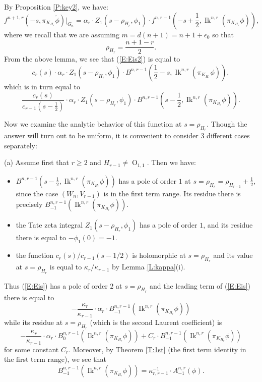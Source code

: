 \documentclass[10pt]{amsart}
\theoremstyle{plain}
\numberwithin{equation}{section}
\begin{document}
\vskip 10pt
  
  By Proposition \ref{P:key2}, we have:
  \[ f^{n+1,r}(-s, \pi_{K_{H_r}} \tilde{\phi})|_{G_{n}}
 = \alpha_r \cdot  Z_1(s - \rho_{H_r}, \phi_1) \cdot  f^{n,r-1}(  -s +
 \frac{1}{2},  {\operatorname{Ik}}^{n,r}(\pi_{K_{H_r}}\phi)), \] 
  where  we recall that  we are assuming $ m = d(n+1) = n+1
  +\epsilon_0$ so that
  \[  \rho_{H_r} = \frac{n+1-r}{2}. \]
  From the above lemma, we see that (\ref{E:Eis2})  is equal to
  \[    c_r(s) \cdot  \alpha_r \cdot Z_1(s - \rho_{H_r}, \phi_1)  \cdot
  B^{n,r-1}(\frac{1}{2}-s, {\operatorname{Ik}}^{n,r}(\pi_{K_{H_r}}\phi)),
   \]
  which is in turn equal to
  \[  \frac{c_r(s)}{c_{r-1}(s -\frac{1}{2})} \cdot  \alpha_r \cdot
  Z_1(s- \rho_{H_r}, \phi_1) \cdot B^{n, r-1}(s - \frac{1}{2},
  {\operatorname{Ik}}^{n,r}(\pi_{K_{H_r}}\phi)). \]
  \vskip 5pt
  
  Now we examine the analytic behavior of this function at 
  $s =\rho_{H_r}$. Though the answer will turn out to be uniform, it is convenient  to consider 3 different cases
  separately:
  \vskip 5pt
  
  \noindent (a)  Assume first that $r \geq 2$ and $H_{r-1} \ne {\operatorname{O}}_{1,1}$. Then we have:
  \begin{itemize}
  \item $B^{n,r-1}(s - \frac{1}{2} , {\operatorname{Ik}}^{n,r}(\pi_{K_{H_r}}\phi))$
    has a pole of order $1$ at $s = \rho_{H_r} = \rho_{H_{r-1}} +
    \frac{1}{2}$, since the case $(W_n, V_{r-1})$ is in the first term
    range. Its residue there is precisely
    $B_{-1}^{n,r-1}({\operatorname{Ik}}^{n,r}(\pi_{K_{H_r}}\phi))$. 
    \item   the Tate zeta integral $ Z_1(s -\rho_{H_r}, \phi_1)$ has a
      pole of order $1$, and its residue there is equal to $-
      \phi_1(0) =-1$. 
   \item the function $c_r(s)/c_{r-1}(s - 1/2)$ is holomorphic at $s =
     \rho_{H_r}$ and its value at $s = \rho_{H_r}$ is equal to
     $\kappa_r/ \kappa_{r-1}$ by Lemma \ref{L:kappa}(i).
  \end{itemize}
  \vskip 5pt
  
  Thus (\ref{E:Eis}) has a pole of order $2$ at $s = \rho_{H_r}$ and the leading term of (\ref{E:Eis}) there is equal to
 \[   - \frac{\kappa_r}{\kappa_{r-1}} \cdot \alpha_r \cdot
 B_{-1}^{n,r-1}({\operatorname{Ik}}^{n,r}(\pi_{K_{H_r}}\phi))   \]
 while its residue at $s = \rho_{H_r}$ (which is the second Laurent
 coefficient) is
 \[   - \frac{\kappa_r}{\kappa_{r-1}} \cdot \alpha_r \cdot
 B_0^{n,r-1}({\operatorname{Ik}}^{n,r}(\pi_{K_{H_r}}\phi)) 
 + C_r  \cdot B_{-1} ^{n,r-1}({\operatorname{Ik}}^{n,r}(\pi_{K_{H_r}}\phi))\]
for some constant $C_r$.  Moreover, by Theorem \ref{T:1st} (the first
term identity in the first term range), we see that
\[  B_{-1}^{n,r-1}({\operatorname{Ik}}^{n,r}(\pi_{K_{H_r}} \phi))=
\kappa_{r,r-1}^{-1} \cdot A_{-1}^{n,r}(\phi). \]
\end{document}

